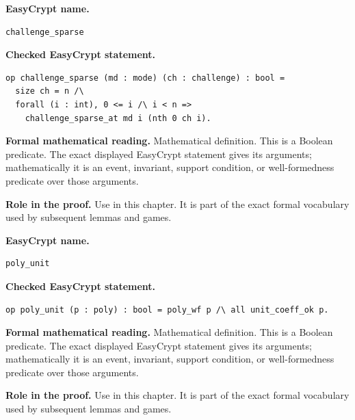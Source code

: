 \begin{formaldefinition}
\noindent\textbf{EasyCrypt name.}
\begin{lstlisting}[language=EasyCrypt,basicstyle=\ttfamily\scriptsize]
challenge_sparse
\end{lstlisting}
\noindent\textbf{Checked EasyCrypt statement.}
\begin{lstlisting}[language=EasyCrypt,basicstyle=\ttfamily\scriptsize]
op challenge_sparse (md : mode) (ch : challenge) : bool =
  size ch = n /\
  forall (i : int), 0 <= i /\ i < n =>
    challenge_sparse_at md i (nth 0 ch i).
\end{lstlisting}
\noindent\textbf{Formal mathematical reading.}
Mathematical definition. This is a Boolean predicate.  The exact displayed EasyCrypt statement gives its arguments; mathematically it is an event, invariant, support condition, or well-formedness predicate over those arguments.

\noindent\textbf{Role in the proof.}
Use in this chapter. It is part of the exact formal vocabulary used by subsequent lemmas and games.

\end{formaldefinition}

\begin{formaldefinition}
\noindent\textbf{EasyCrypt name.}
\begin{lstlisting}[language=EasyCrypt,basicstyle=\ttfamily\scriptsize]
poly_unit
\end{lstlisting}
\noindent\textbf{Checked EasyCrypt statement.}
\begin{lstlisting}[language=EasyCrypt,basicstyle=\ttfamily\scriptsize]
op poly_unit (p : poly) : bool = poly_wf p /\ all unit_coeff_ok p.
\end{lstlisting}
\noindent\textbf{Formal mathematical reading.}
Mathematical definition. This is a Boolean predicate.  The exact displayed EasyCrypt statement gives its arguments; mathematically it is an event, invariant, support condition, or well-formedness predicate over those arguments.

\noindent\textbf{Role in the proof.}
Use in this chapter. It is part of the exact formal vocabulary used by subsequent lemmas and games.

\end{formaldefinition}

